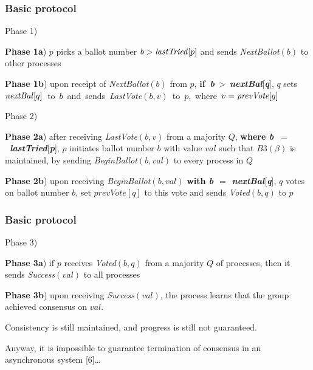 \documentclass[10 pt]{beamer}
\begin{document}
\begin{frame}
\frametitle{Basic protocol}

  Phase 1)
   
  \hspace{3 mm} \textbf{Phase 1a}) $p$ picks a ballot number $b > \text{\textit{lastTried}}[p]$ and sends \textit{NextBallot}$(b)$ to other processes
   
  \hspace{3 mm} \textbf{Phase 1b}) upon receipt of \textit{NextBallot}$(b)$ from $p$, \mbox{\textbf{if \textit{b}} > \textbf{\textit{nextBal}}[\textbf{\textit{q}}],} $q$ \mbox{sets $\text{\textit{nextBal}}[q]$ to $b$ and sends \textit{LastVote}$(b, v)$ to $p$, where $v = \text{\textit{prevVote}}[q]$}
   
  \vspace{6 mm}
    
  Phase 2)
   
  \hspace{3 mm} \textbf{Phase 2a}) after receiving \textit{LastVote}$(b, v)$ from a majority $Q$, \textbf{where \mbox{\textit{b $=$ lastTried}}}[\textbf{\textit{p}}], $p$ initiates ballot  number $b$ with value $val$ such that $B3(\beta)$ is maintained, by sending \textit{BeginBallot}$(b, val)$ to every process in $Q$
      
  \hspace{3 mm} \textbf{Phase 2b}) upon receiving \textit{BeginBallot}$(b, val)$ \textbf{with \textit{b $=$ nextBal}}[\textbf{\textit{q}}], $q$ votes on ballot number $b$, set $prevVote[q]$ to this vote and sends \textit{Voted}$(b, q)$ to $p$
  
\end{frame}



\begin{frame}
\frametitle{Basic protocol}
   
  Phase 3)
   
  \hspace{3 mm} \textbf{Phase 3a}) if $p$ receives \textit{Voted}$(b, q)$ from a majority $Q$ of processes, then it sends \textit{Success}$(val)$ to all processes
      
  \hspace{3 mm} \textbf{Phase 3b}) upon receiving \textit{Success}$(val)$, the process learns that the group achieved consensus on $val$.
  
  \vspace{6mm}
  Consistency is still maintained, and progress is still not guaranteed.

  \vspace{6mm}
  Anyway, it is impossible to guarantee termination of consensus in an asynchronous system [6]\ldots 
 
\end{frame}
\end{document}
